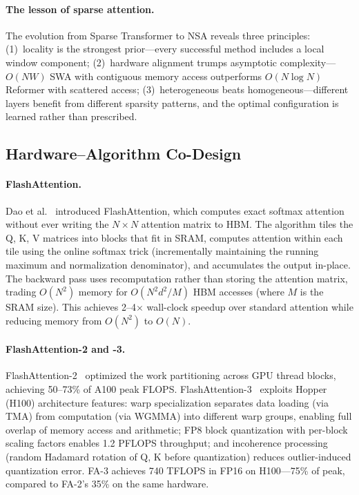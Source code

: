 \paragraph{The lesson of sparse attention.}
The evolution from Sparse Transformer to NSA reveals three principles: (1)~locality is the strongest prior---every successful method includes a local window component; (2)~hardware alignment trumps asymptotic complexity---$O(NW)$ SWA with contiguous memory access outperforms $O(N \log N)$ Reformer with scattered access; (3)~heterogeneous beats homogeneous---different layers benefit from different sparsity patterns, and the optimal configuration is learned rather than prescribed.


\subsection{Hardware--Algorithm Co-Design}
\label{subsec:hw-attn}

\paragraph{FlashAttention.}
Dao et al.~\cite{dao2022flashattention} introduced FlashAttention, which computes exact softmax attention without ever writing the $N \times N$ attention matrix to HBM. The algorithm tiles the Q, K, V matrices into blocks that fit in SRAM, computes attention within each tile using the online softmax trick (incrementally maintaining the running maximum and normalization denominator), and accumulates the output in-place. The backward pass uses recomputation rather than storing the attention matrix, trading $O(N^2)$ memory for $O(N^2 d^2/M)$ HBM accesses (where $M$ is the SRAM size). This achieves 2--4$\times$ wall-clock speedup over standard attention while reducing memory from $O(N^2)$ to $O(N)$.

\paragraph{FlashAttention-2 and -3.}
FlashAttention-2~\cite{dao2023flashattention2} optimized the work partitioning across GPU thread blocks, achieving 50--73\% of A100 peak FLOPS. FlashAttention-3~\cite{shah2024flashattention3} exploits Hopper (H100) architecture features: warp specialization separates data loading (via TMA) from computation (via WGMMA) into different warp groups, enabling full overlap of memory access and arithmetic; FP8 block quantization with per-block scaling factors enables 1.2 PFLOPS throughput; and incoherence processing (random Hadamard rotation of Q, K before quantization) reduces outlier-induced quantization error. FA-3 achieves 740 TFLOPS in FP16 on H100---75\% of peak, compared to FA-2's 35\% on the same hardware.

